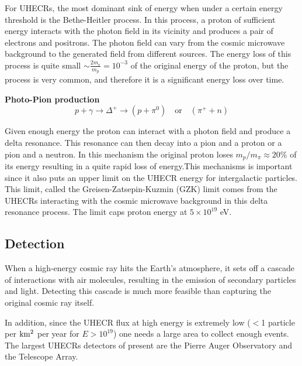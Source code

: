 For UHECRs, the most dominant sink of energy when under a certain energy threshold is the Bethe-Heitler process. In this process, a proton of sufficient energy interacts with the 
photon field in its vicinity and produces a pair of electrons and positrons. The photon field can vary from the cosmic microwave background to the generated field from different sources. 
The energy loss of this process is quite small $\sim \frac{2m_e}{m_p}= 10^{-3}$ of the original energy of the proton, but the process is very common, and therefore it is a significant energy loss over time.


\textbf{Photo-Pion production }
\begin{equation}
    p + \gamma \rightarrow \Delta^+ \rightarrow (p + \pi^0)\quad \text{or} \quad (\pi^+ + n)
    \label{eq:delta_resonance}
\end{equation}

Given enough energy the proton can interact with a photon field and produce a delta resonance. This resonance can then decay into a pion and a proton or a pion and a neutron. In this mechanism the original proton loses $m_p/m_\pi \approx 20\% $ of its energy resulting in a quite rapid loss of energy.This mechanisms is important since it also puts an upper limit on the UHECR energy for intergalactic particles. 
This limit, called the Greisen-Zatsepin-Kuzmin (GZK) limit comes from the UHECRs interacting with the cosmic microwave background in this delta resonance process. The limit caps proton energy at $5\times 10^{19}$ eV.







\subsection{Detection}
When a high-energy cosmic ray hits the Earth's atmosphere, it sets off a cascade of interactions with air molecules, resulting in the emission of secondary particles and light. Detecting this cascade is much more feasible than capturing the original cosmic ray itself.

In addition, since the UHECR flux at high energy is extremely low ($<$1 particle per $\rm km^2$ per year for $E > 10^{19}$) one needs a large area to collect enough events. The largest UHECRs detectors of present are the Pierre Auger Observatory and the Telescope Array.

